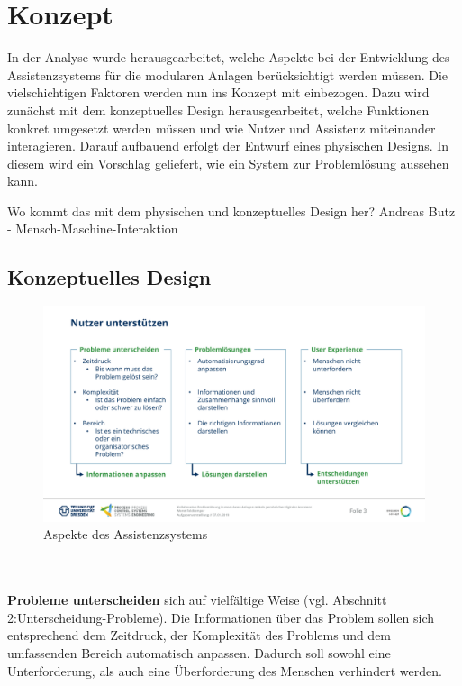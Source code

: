 \chapter{Konzept}
\label{sec:Konzept}
In der Analyse wurde herausgearbeitet, welche Aspekte bei der Entwicklung des Assistenzsystems für die modularen Anlagen berücksichtigt werden müssen. Die vielschichtigen Faktoren werden nun ins Konzept mit einbezogen. Dazu wird zunächst mit dem konzeptuelles Design herausgearbeitet, welche Funktionen konkret umgesetzt werden müssen und wie Nutzer und Assistenz miteinander interagieren. Darauf aufbauend erfolgt der Entwurf eines physischen Designs. In diesem wird ein Vorschlag geliefert, wie ein System zur Problemlösung aussehen kann.

Wo kommt das mit dem physischen und konzeptuelles Design her? Andreas Butz - Mensch-Maschine-Interaktion 

\section{Konzeptuelles Design}
\begin{figure}[htbp]
\centering
\includegraphics[scale=0.45]{DA_files/Bilder/Konzept/Nutzer-unterstuetzen.pdf}
\caption{Aspekte des Assistenzsystems}
\label{pic:Nutzer-Unterstuetzen}
\end{figure}
\\ \\
\textbf{Probleme unterscheiden} sich auf vielfältige Weise (vgl. Abschnitt {2:Unterscheidung-Probleme}). Die Informationen über das Problem sollen sich entsprechend dem Zeitdruck, der Komplexität des Problems und dem umfassenden Bereich automatisch anpassen. Dadurch soll sowohl eine Unterforderung, als auch eine Überforderung des Menschen verhindert werden.

